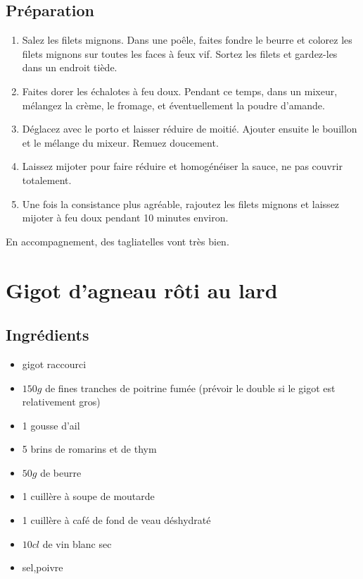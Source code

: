 \subsection*{Préparation}
\begin{enumerate}
\item Salez les filets mignons. Dans une poêle, faites fondre le beurre et colorez les filets mignons sur toutes les faces à feux vif. Sortez les filets et gardez-les dans un endroit tiède.
\item Faites dorer les échalotes à feu doux. Pendant ce temps, dans un mixeur, mélangez la crème, le fromage, et éventuellement la poudre d'amande.
\item Déglacez avec le porto et laisser réduire de moitié. Ajouter ensuite le bouillon et le mélange du mixeur. Remuez doucement.
\item Laissez mijoter pour faire réduire et homogénéiser la sauce, ne pas couvrir totalement. 
\item Une fois la consistance plus agréable, rajoutez les filets mignons et laissez mijoter à feu doux pendant 10 minutes environ.
\end{enumerate}

\begin{remarque}
En accompagnement, des tagliatelles vont très bien.
\end{remarque}




\newpage
\section{Gigot d'agneau rôti au lard}
\subsection*{Ingrédients}
\begin{itemize}
\item gigot raccourci
\item $150\unit{g}$ de fines tranches de poitrine fumée (prévoir le double si le gigot est relativement gros)
\item 1 gousse d'ail
\item 5 brins de romarins et de thym
\item $50\unit{g}$ de beurre
\item 1 cuillère à soupe de moutarde
\item 1 cuillère à café de fond de veau déshydraté
\item $10\unit{cl}$ de vin blanc sec
\item sel,poivre
\end{itemize}

